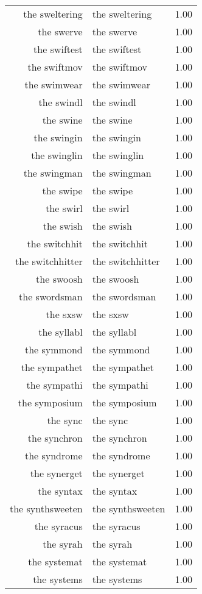 \begin{table}[ht]
\begin{tabular}{rlr}
  the sweltering & the sweltering & 1.00 \\ 
  the swerve & the swerve & 1.00 \\ 
  the swiftest & the swiftest & 1.00 \\ 
  the swiftmov & the swiftmov & 1.00 \\ 
  the swimwear & the swimwear & 1.00 \\ 
  the swindl & the swindl & 1.00 \\ 
  the swine & the swine & 1.00 \\ 
  the swingin & the swingin & 1.00 \\ 
  the swinglin & the swinglin & 1.00 \\ 
  the swingman & the swingman & 1.00 \\ 
  the swipe & the swipe & 1.00 \\ 
  the swirl & the swirl & 1.00 \\ 
  the swish & the swish & 1.00 \\ 
  the switchhit & the switchhit & 1.00 \\ 
  the switchhitter & the switchhitter & 1.00 \\ 
  the swoosh & the swoosh & 1.00 \\ 
  the swordsman & the swordsman & 1.00 \\ 
  the sxsw & the sxsw & 1.00 \\ 
  the syllabl & the syllabl & 1.00 \\ 
  the symmond & the symmond & 1.00 \\ 
  the sympathet & the sympathet & 1.00 \\ 
  the sympathi & the sympathi & 1.00 \\ 
  the symposium & the symposium & 1.00 \\ 
  the sync & the sync & 1.00 \\ 
  the synchron & the synchron & 1.00 \\ 
  the syndrome & the syndrome & 1.00 \\ 
  the synerget & the synerget & 1.00 \\ 
  the syntax & the syntax & 1.00 \\ 
  the synthsweeten & the synthsweeten & 1.00 \\ 
  the syracus & the syracus & 1.00 \\ 
  the syrah & the syrah & 1.00 \\ 
  the systemat & the systemat & 1.00 \\ 
  the systems & the systems & 1.00 \\ 

\end{tabular}
\end{table}
